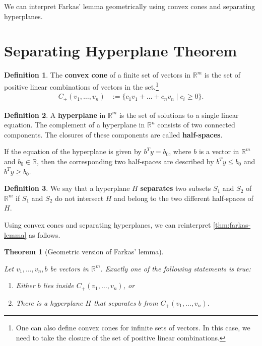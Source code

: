 \documentclass[
]{book}
\providecommand{\tightlist}{%
  \setlength{\itemsep}{0pt}\setlength{\parskip}{0pt}}
\newtheorem{theorem}{Theorem}[chapter]
\theoremstyle{definition}
\newtheorem{definition}{Definition}[chapter]
\theoremstyle{definition}
\theoremstyle{definition}
\theoremstyle{definition}
\theoremstyle{remark}
\begin{document}
We can interpret Farkas' lemma geometrically using convex cones and separating hyperplanes.

\hypertarget{separating-hyperplane-theorem}{%
\section{Separating Hyperplane Theorem}\label{separating-hyperplane-theorem}}

\begin{definition}
The \textbf{convex cone} of a finite set of vectors in \(\mathbb{R}^m\) is the set of positive linear combinations of vectors in the set.\footnote{One can also define convex cones for infinite sets of vectors. In this case, we need to take the closure of the set of positive linear combinations.}
\begin{align*}
  C_+(v_1, \dots, v_n) & := \{c_1 v_1 + \dots + c_n v_n \mid c_i \ge 0 \}.
\end{align*}
\end{definition}

\begin{definition}
A \textbf{hyperplane} in \(\mathbb{R}^m\) is the set of solutions to a single linear equation.
The complement of a hyperplane in \(\mathbb{R}^n\) consists of two connected components.
The closures of these components are called \textbf{half-spaces}.
\end{definition}

If the equation of the hyperplane is given by \(b^T y = b_0\), where \(b\) is a vector in \(\mathbb{R}^m\) and \(b_0 \in \mathbb{R}\), then the corresponding two half-spaces are described by \(b^T y \le b_0\) and \(b^T y \ge b_0\).

\begin{definition}
We say that a hyperplane \(H\) \textbf{separates} two subsets \(S_1\) and \(S_2\) of \(\mathbb{R}^m\) if \(S_1\) and \(S_2\) do not intersect \(H\) and belong to the two different half-spaces of \(H\).
\end{definition}

Using convex cones and separating hyperplanes, we can reinterpret \ref{thm:farkas-lemma} as follows.

\begin{theorem}[Geometric version of Farkas' lemma]
\protect\hypertarget{thm:farkas-geometry}{}\label{thm:farkas-geometry}

Let \(v_1, \dots, v_n, b\) be vectors in \(\mathbb{R}^m\). Exactly one of the following statements is true:

\begin{enumerate}
\def\labelenumi{\arabic{enumi}.}
\tightlist
\item
  Either \(b\) lies inside \(C_+(v_1, \dots, v_n)\), or
\item
  There is a hyperplane \(H\) that separates \(b\) from \(C_+(v_1, \dots, v_n)\).
\end{enumerate}

\end{theorem}
\end{document}
